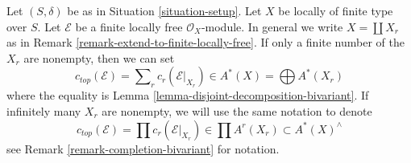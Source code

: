 \begin{remark}
\label{remark-top-chern-class}
Let $(S, \delta)$ be as in Situation \ref{situation-setup}. Let $X$
be locally of finite type over $S$. Let $\mathcal{E}$ be a
finite locally free $\mathcal{O}_X$-module. In general
we write $X = \coprod X_r$ as in
Remark \ref{remark-extend-to-finite-locally-free}.
If only a finite number of the $X_r$ are nonempty, then
we can set
$$
c_{top}(\mathcal{E}) = \sum\nolimits_r c_r(\mathcal{E}|_{X_r})
\in A^*(X) = \bigoplus A^*(X_r)
$$
where the equality is Lemma \ref{lemma-disjoint-decomposition-bivariant}.
If infinitely many $X_r$ are nonempty, we will use the same
notation to denote
$$
c_{top}(\mathcal{E}) = \prod c_r(\mathcal{E}|_{X_r})
\in \prod A^r(X_r) \subset A^*(X)^\wedge
$$
see Remark \ref{remark-completion-bivariant} for notation.
\end{remark}











